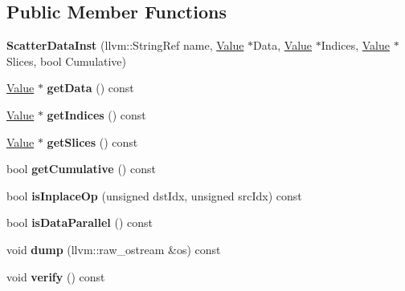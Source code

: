 \subsection*{Public Member Functions}
\begin{DoxyCompactItemize}
\item 
\mbox{\label{classglow_1_1_scatter_data_inst_af2e4f6089adbb4347af595f8f74450df}} 
{\bfseries Scatter\+Data\+Inst} (llvm\+::\+String\+Ref name, \hyperlink{classglow_1_1_value}{Value} $\ast$Data, \hyperlink{classglow_1_1_value}{Value} $\ast$Indices, \hyperlink{classglow_1_1_value}{Value} $\ast$Slices, bool Cumulative)
\item 
\mbox{\label{classglow_1_1_scatter_data_inst_a8a47d95752bb0e1dccbbc0f0291d8813}} 
\hyperlink{classglow_1_1_value}{Value} $\ast$ {\bfseries get\+Data} () const
\item 
\mbox{\label{classglow_1_1_scatter_data_inst_a8b82c5eb6d5e12044a7787730f834fc9}} 
\hyperlink{classglow_1_1_value}{Value} $\ast$ {\bfseries get\+Indices} () const
\item 
\mbox{\label{classglow_1_1_scatter_data_inst_a38809595b139ffe13f8478d12bafd05f}} 
\hyperlink{classglow_1_1_value}{Value} $\ast$ {\bfseries get\+Slices} () const
\item 
\mbox{\label{classglow_1_1_scatter_data_inst_abc464ad1a120e0fabfd5566bd55b2c5a}} 
bool {\bfseries get\+Cumulative} () const
\item 
\mbox{\label{classglow_1_1_scatter_data_inst_a48112061f300599c59d9b64b74df81b4}} 
bool {\bfseries is\+Inplace\+Op} (unsigned dst\+Idx, unsigned src\+Idx) const
\item 
\mbox{\label{classglow_1_1_scatter_data_inst_a3498de00682bc9f582b2d707499904c8}} 
bool {\bfseries is\+Data\+Parallel} () const
\item 
\mbox{\label{classglow_1_1_scatter_data_inst_a12c45a1239feca6dbfe9484c063084ae}} 
void {\bfseries dump} (llvm\+::raw\+\_\+ostream \&os) const
\item 
\mbox{\label{classglow_1_1_scatter_data_inst_a9a4883f910e892588db1981edcbb4ba8}} 
void {\bfseries verify} () const
\end{DoxyCompactItemize}
